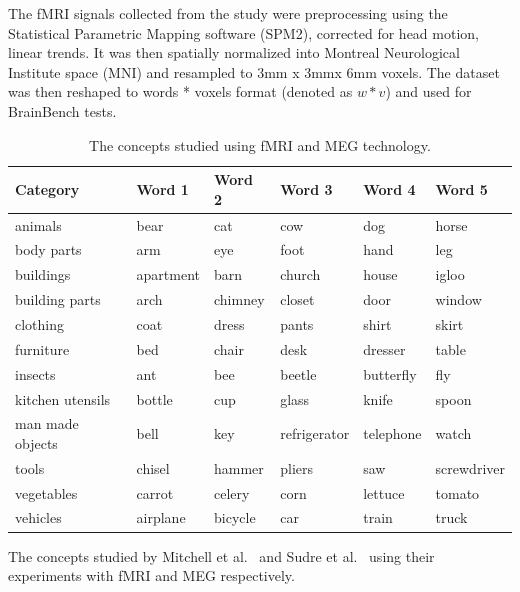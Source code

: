 The fMRI signals collected from the study were preprocessing using the Statistical Parametric Mapping software (SPM2), corrected for head motion, linear trends. It was then spatially normalized into Montreal Neurological Institute space (MNI) and resampled to 3mm x 3mmx 6mm voxels. The dataset was then reshaped to words * voxels format (denoted as $w * v$)  and used for BrainBench tests. 

\begin{table}[t]
\centering

\begin{tabular}{|l|l|l|l|l|l|}
\hline
Category         & Word 1    & Word 2  & Word 3       & Word 4    & Word 5      \\ \hline
animals          & bear      & cat     & cow          & dog       & horse       \\ \hline
body parts       & arm       & eye     & foot         & hand      & leg         \\ \hline
buildings        & apartment & barn    & church       & house     & igloo       \\ \hline
building parts   & arch      & chimney & closet       & door      & window      \\ \hline
clothing         & coat      & dress   & pants        & shirt     & skirt       \\ \hline
furniture        & bed       & chair   & desk         & dresser   & table       \\ \hline
insects          & ant       & bee     & beetle       & butterfly & fly         \\ \hline
kitchen utensils & bottle    & cup     & glass        & knife     & spoon       \\ \hline
man made objects & bell      & key     & refrigerator & telephone & watch       \\ \hline
tools            & chisel    & hammer  & pliers       & saw       & screwdriver \\ \hline
vegetables       & carrot    & celery  & corn         & lettuce   & tomato      \\ \hline
vehicles         & airplane  & bicycle & car          & train     & truck       \\ \hline
\end{tabular}
\caption{The concepts studied using fMRI and MEG technology.}
The concepts studied by Mitchell et al.~\cite{Mitchell1191} and Sudre et al.~\cite{SUDRE2012451} using their experiments with fMRI and MEG respectively.
\label{DataScienceFMRI}
\end{table}


